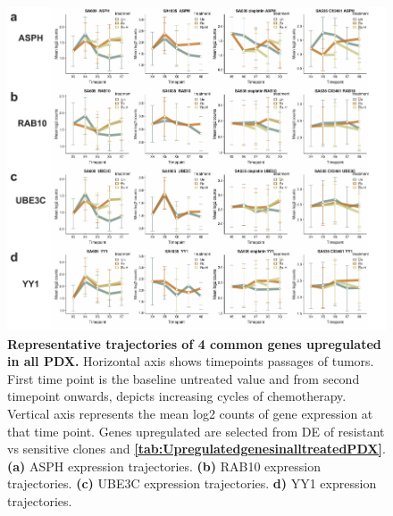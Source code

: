 \begin{figure}
\centering
  \includegraphics[width=\textwidth]{Figures/commongenesfromvolcanoplots.pdf}
	
\caption[Representative trajectories of 4 common genes upregulated in all PDX]
	{\small
	\textbf{Representative trajectories of 4 common genes upregulated in all PDX.}
	   Horizontal axis shows timepoints passages of tumors. First time point is the baseline untreated value and from second timepoint onwards, depicts increasing cycles of chemotherapy. Vertical axis represents the mean log2 counts of gene expression at that time point. Genes upregulated are selected from \ac{DE} of resistant vs sensitive clones and \textbf{\autoref{tab:UpregulatedgenesinalltreatedPDX}}.
	   \textbf{(a)} ASPH expression trajectories.
	    \textbf{(b)} RAB10 expression trajectories.
	    \textbf{(c)} UBE3C expression trajectories.
	     \textbf{d)} YY1 expression trajectories.
	}
	\label{fig:commongenesfromvolcanoplots}
\end{figure}


